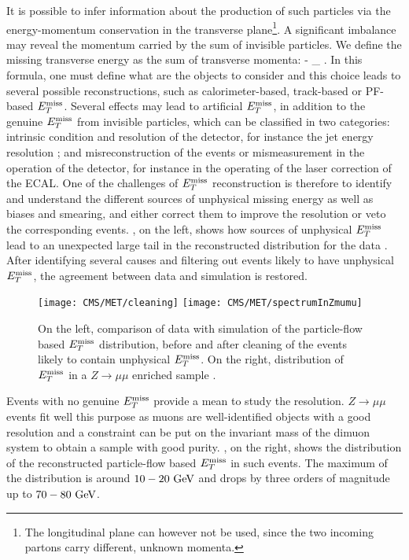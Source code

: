     It is possible to infer information about the production
    of such particles via the energy-momentum conservation in the transverse plane\footnote{The
    longitudinal plane can however not be used, since the two incoming partons carry
    different, unknown momenta.}. A significant imbalance may reveal the momentum carried by
    the sum of invisible particles. We define the missing transverse energy as the
    sum of transverse momenta:
    {
        \vec{\MET}  - \sum_{} \vec{\pT}.
    }
    In this formula, one must define what are the objects to consider and this choice
    leads to several possible reconstructions, such as calorimeter-based, track-based
    or PF-based $E_T^\text{miss}$. Several effects may lead to artificial $E_T^\text{miss}$, in addition to the
    genuine $E_T^\text{miss}$ from invisible particles, which can be classified in two categories:
    intrinsic condition and resolution of the detector, for instance the jet energy
    resolution ; and misreconstruction of the events or mismeasurement in the
    operation of the detector, for instance in the operating of the laser correction
    of the ECAL. One of the challenges of $E_T^\text{miss}$ reconstruction is therefore to identify
    and understand the different sources of unphysical missing energy as well as biases and
    smearing, and either correct them to improve the resolution or veto the corresponding
    events.
    , on the left, shows how sources of unphysical $E_T^\text{miss}$
    lead to an unexpected large tail in the reconstructed distribution for the data \cite{METperf}.
    After identifying several causes and filtering out events likely to have unphysical
    $E_T^\text{miss}$, the agreement between data and simulation is restored.

    \begin{figure}[h!]
        \centering
        \texttt{[image: CMS/MET/cleaning]}
        \texttt{[image: CMS/MET/spectrumInZmumu]}
        \caption{On the left, comparison of data with simulation of the
        particle-flow based $E_T^\text{miss}$ distribution, before and after cleaning of the events
        likely to contain unphysical $E_T^\text{miss}$. On the right, distribution of $E_T^\text{miss}$ in
        a $Z \rightarrow \mu\mu$ enriched sample \cite{METperf}. }
        \label{fig:METspectrum}
    \end{figure}

    Events with no genuine $E_T^\text{miss}$ provide a mean to study the resolution.
    $Z \rightarrow \mu\mu$ events fit well this purpose as muons are well-identified objects
    with a good resolution and a constraint can be put on the invariant mass of the
    dimuon system to obtain a sample with good purity. ,
    on the right, shows the distribution of the reconstructed particle-flow based
    $E_T^\text{miss}$ in such events. The maximum of the distribution is around $10-20~\text{GeV}$ and
    drops by three orders of magnitude up to $70-80~\text{GeV}$.

